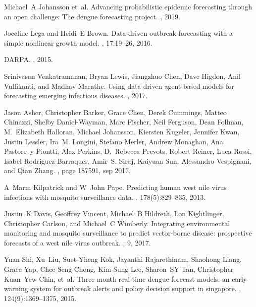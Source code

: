 \documentclass[a4paper]{article}
\begin{document}
\begin{thebibliography}{100}
Michael~A Johansson et~al.
\newblock Advancing probabilistic epidemic forecasting through an open
  challenge: The dengue forecasting project.
, 2019.

Joceline Lega and Heidi~E Brown.
\newblock Data-driven outbreak forecasting with a simple nonlinear growth
  model.
, 17:19--26, 2016.

DARPA.
, 2015.

Srinivasan Venkatramanan, Bryan Lewis, Jiangzhuo Chen, Dave Higdon, Anil
  Vullikanti, and Madhav Marathe.
\newblock Using data-driven agent-based models for forecasting emerging
  infectious diseases.
, 2017.

Jason Asher, Christopher Barker, Grace Chen, Derek Cummings, Matteo Chinazzi,
  Shelby Daniel-Wayman, Marc Fischer, Neil Ferguson, Dean Follman, M.~Elizabeth
  Halloran, Michael Johansson, Kiersten Kugeler, Jennifer Kwan, Justin Lessler,
  Ira~M. Longini, Stefano Merler, Andrew Monaghan, Ana Pastore~y Piontti, Alex
  Perkins, D.~Rebecca Prevots, Robert Reiner, Luca Rossi, Isabel
  Rodriguez-Barraquer, Amir~S. Siraj, Kaiyuan Sun, Alessandro Vespignani, and
  Qian Zhang.
, page 187591, sep 2017.

A~Marm Kilpatrick and W~John Pape.
\newblock Predicting human west nile virus infections with mosquito
  surveillance data.
, 178(5):829--835, 2013.

Justin~K Davis, Geoffrey Vincent, Michael~B Hildreth, Lon Kightlinger,
  Christopher Carlson, and Michael~C Wimberly.
\newblock Integrating environmental monitoring and mosquito surveillance to
  predict vector-borne disease: prospective forecasts of a west nile virus
  outbreak.
, 9, 2017.

Yuan Shi, Xu~Liu, Suet-Yheng Kok, Jayanthi Rajarethinam, Shaohong Liang, Grace
  Yap, Chee-Seng Chong, Kim-Sung Lee, Sharon~SY Tan, Christopher Kuan~Yew Chin,
  et~al.
\newblock Three-month real-time dengue forecast models: an early warning system
  for outbreak alerts and policy decision support in singapore.
, 124(9):1369--1375, 2015.


\end{thebibliography}
\end{document}
